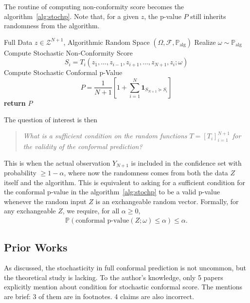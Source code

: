 \documentclass{article}
\newcommand{\prob}[1]{\mathbb{P}\left( #1 \right)}
\newcommand{\oo}[1]{\left( #1 \right)}
\newcommand{\cc}[1]{\left[ #1 \right]}
\begin{document}
    The routine of computing non-conformity score becomes the algorithm~\ref{alg:stochp}. Note that, for a given $z$, the p-value $P$ still inherits randomness from the algorithm.
    \begin{algorithm}
    \caption{Conformal p-Value via Stochastic $T$}
    \label{alg:stochp}
    \begin{algorithmic}[1]
    \REQUIRE Full Data $z \in \mathcal{Z}^{N+1}$, Algorithmic Random Space $\oo{\Omega, \mathcal{F}, \mathbb{P}_{\text{alg}}}$
    \STATE Realize $\omega \sim \mathbb{P}_{\text{alg}}$
        \STATE Compute Stochastic Non-Conformity Score
        \[S_i = T_i\oo{z_1, \dots, z_{i-1}, z_{i+1}, \dots, z_{N+1}, z_i; \omega}\]
    \ENDFOR
    \STATE Compute Stochastic Conformal p-Value
    \[P = \frac{1}{N+1} \cc{1 + \sum_{i=1}^{N} \mathbf{1}_{S_{N+1} \succcurlyeq S_i}}\]
    \STATE \textbf{return} $P$
    \end{algorithmic}
    \end{algorithm}

    The question of interest is then
    \begin{quote}
    \emph{What is a sufficient condition on the random functions $T = \cc{T_i}_{i=1}^{N+1}$ for the validity of the conformal prediction?}
    \end{quote}
    This is when the actual observation $Y_{N+1}$ is included in the confidence set with probability $\ge 1-\alpha$, where now the randomness comes from both the data $Z$ itself and the algorithm. This is equivalent to asking for a sufficient condition for the conformal p-value in the algorithm~\ref{alg:stochp} to be a valid p-value whenever the random input $Z$ is an exchangeable random vector. Formally, for any exchangeable $Z$, we require, for all $\alpha \ge 0$,
    \begin{align*}
        \prob{\text{conformal p-value}\oo{Z; \omega} \le \alpha}\le \alpha.
    \end{align*}
    
    \subsection{Prior Works}
    As discussed, the stochasticity in full conformal prediction is not uncommon, but the theoretical study is lacking. To the author's knowledge, only 5 papers explicitly mention about condition for stochastic conformal score. The mentions are brief: 3 of them are in footnotes. 4 claims are also incorrect.
\end{document}
